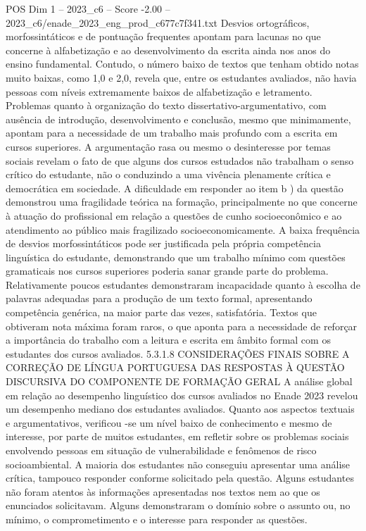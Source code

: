 \begin{textsample}{POS Dim 1 – 2023\_c6 – Score -2.00 – 2023\_c6/enade\_2023\_eng\_prod\_c677c7f341.txt}
Desvios ortográficos, morfossintáticos e de pontuação frequentes apontam para lacunas no que concerne à alfabetização e ao desenvolvimento da escrita ainda nos anos do ensino fundamental.
Contudo, o número baixo de textos que tenham obtido notas muito baixas, como 1,0 e 2,0, revela que, entre os estudantes avaliados, não havia pessoas com níveis extremamente baixos de alfabetização e letramento.
Problemas quanto à organização do texto dissertativo-argumentativo, com ausência de introdução, desenvolvimento e conclusão, mesmo que minimamente, apontam para a necessidade de um trabalho mais profundo com a escrita em cursos superiores.
A argumentação rasa ou mesmo o desinteresse por temas sociais revelam o fato de que alguns dos cursos estudados não trabalham o senso crítico do estudante, não o conduzindo a uma vivência plenamente crítica e democrática em sociedade.
A dificuldade em responder ao item b ) da questão demonstrou uma fragilidade teórica na formação, principalmente no que concerne à atuação do profissional em relação a questões de cunho socioeconômico e ao atendimento ao público mais fragilizado socioeconomicamente.
A baixa frequência de desvios morfossintáticos pode ser justificada pela própria competência linguística do estudante, demonstrando que um trabalho mínimo com questões gramaticais nos cursos superiores poderia sanar grande parte do problema.
Relativamente poucos estudantes demonstraram incapacidade quanto à escolha de palavras adequadas para a produção de um texto formal, apresentando competência genérica, na maior parte das vezes, satisfatória.
Textos que obtiveram nota máxima foram raros, o que aponta para a necessidade de reforçar a importância do trabalho com a leitura e escrita em âmbito formal com os estudantes dos cursos avaliados. 5.3.1.8 CONSIDERAÇÕES FINAIS SOBRE A CORREÇÃO DE LÍNGUA PORTUGUESA DAS RESPOSTAS À QUESTÃO DISCURSIVA DO COMPONENTE DE FORMAÇÃO GERAL A análise global em relação ao desempenho linguístico dos cursos avaliados no Enade 2023 revelou um desempenho mediano dos estudantes avaliados.
Quanto aos aspectos textuais e argumentativos, verificou -se um nível baixo de conhecimento e mesmo de interesse, por parte de muitos estudantes, em refletir sobre os problemas sociais envolvendo pessoas em situação de vulnerabilidade e fenômenos de risco socioambiental.
A maioria dos estudantes não conseguiu apresentar uma análise crítica, tampouco responder conforme solicitado pela questão.
Alguns estudantes não foram atentos às informações apresentadas nos textos nem ao que os enunciados solicitavam.
Alguns demonstraram o domínio sobre o assunto ou, no mínimo, o comprometimento e o interesse para responder as questões.

\end{textsample}
